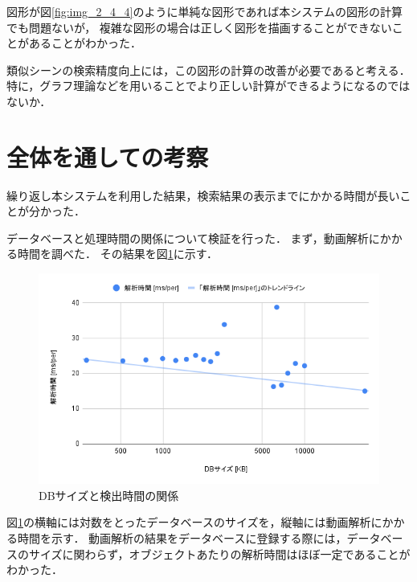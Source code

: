 \documentclass[a4j,12pt,dvipdfmx]{jreport}
\begin{document}
図形が図\ref{fig:img_2_4_4}のように単純な図形であれば本システムの図形の計算でも問題ないが，
複雑な図形の場合は正しく図形を描画することができないことがあることがわかった．

類似シーンの検索精度向上には，この図形の計算の改善が必要であると考える．
特に，グラフ理論などを用いることでより正しい計算ができるようになるのではないか．

\section{全体を通しての考察}\label{chap4-4}

繰り返し本システムを利用した結果，検索結果の表示までにかかる時間が長いことが分かった．

データベースと処理時間の関係について検証を行った．
まず，動画解析にかかる時間を調べた．
その結果を図\ref{fig:img_2_5}に示す．
\begin{figure}[H]
  \centering
  \includegraphics[width=13cm]{image/result_2_5.png}
  \caption{DBサイズと検出時間の関係}
  \label{fig:img_2_5}
\end{figure}

図\ref{fig:img_2_5}の横軸には対数をとったデータベースのサイズを，縦軸には動画解析にかかる時間を示す．
動画解析の結果をデータベースに登録する際には，データベースのサイズに関わらず，オブジェクトあたりの解析時間はほぼ一定であることがわかった．
\end{document}
